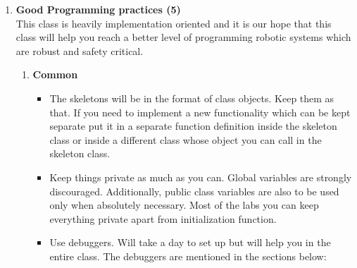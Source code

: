 \documentclass[letta4 paper]{article}
\begin{document}
\begin{enumerate}
    \item \textbf{Good Programming practices (5)}\\
    This class is heavily implementation oriented and it is our hope that this class will help you reach a better level of programming robotic systems which are robust and safety critical. \
    \begin{enumerate}
        \item \textbf{Common}
        \begin{itemize}
            \item The skeletons will be in the format of class objects. Keep them as that. If you need to implement a new functionality which can be kept separate put it in a separate function definition inside the skeleton class or inside a different class whose object you can call in the skeleton class. 
            \item Keep things private as much as you can. Global variables are strongly discouraged. Additionally, public class variables are also to be used only when absolutely necessary. Most of the labs you can keep everything private apart from initialization function.
            \item Use debuggers. Will take a day to set up but will help you in the entire class. The debuggers are mentioned in the sections below:  \\
            

\end{itemize}
\end{enumerate}
\end{enumerate}
\end{document}
